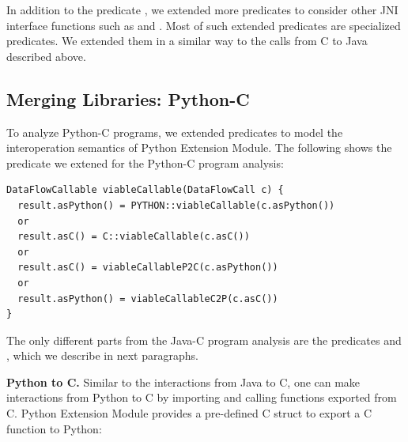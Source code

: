 In addition to the predicate ,
we extended more predicates to consider other JNI interface functions such as
 and .
Most of such extended predicates are specialized  predicates.
We extended them in a similar way to the calls from C to Java described above.

\subsection{Merging Libraries: Python-C}\label{sec:merging2}

To analyze Python-C programs, we extended predicates to model the
interoperation semantics of Python Extension Module.
The following shows the  predicate we extened for the
Python-C program analysis: 

\begin{lstlisting}[style=codeql,xleftmargin=2.5em]
DataFlowCallable viableCallable(DataFlowCall c) {
  result.asPython() = PYTHON::viableCallable(c.asPython())
  or
  result.asC() = C::viableCallable(c.asC())
  or
  result.asC() = viableCallableP2C(c.asPython())
  or
  result.asPython() = viableCallableC2P(c.asC())
}
\end{lstlisting}

\noindent
The only different parts from the Java-C program analysis are the predicates
 and , which we describe in
next paragraphs.


\textbf{Python to C.} Similar to the interactions from Java to C, one can make
interactions from Python to C by importing and calling functions exported from
C. Python Extension Module provides a pre-defined C struct  to
export a C function to Python: 

